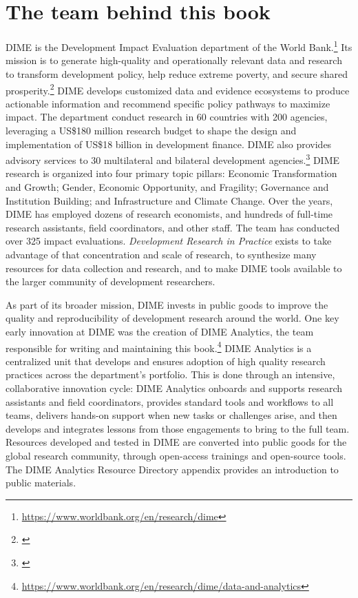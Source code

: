 \section{The team behind this book}
DIME is the Development Impact Evaluation department of the World Bank.\footnote{
  \url{https://www.worldbank.org/en/research/dime}}
Its mission is to generate high-quality and operationally relevant data and research
to transform development policy, help reduce extreme poverty, and secure shared prosperity.\footnote{\cite{legovini2015impact}}
DIME develops customized data and evidence ecosystems to produce actionable information
and recommend specific policy pathways to maximize impact.
The department conduct research in 60 countries with 200 agencies, leveraging a
US\$180 million research budget to shape the design and implementation of
US\$18 billion in development finance.
DIME also provides advisory services to 30 multilateral and bilateral development agencies.\footnote{\cite{legovini2019}}
DIME research is organized into four primary topic pillars:
Economic Transformation and Growth;
Gender, Economic Opportunity, and Fragility;
Governance and Institution Building;
and Infrastructure and Climate Change.
Over the years, DIME has employed dozens of research economists,
and hundreds of full-time research assistants, field coordinators, and other staff.
The team has conducted over 325 impact evaluations.
\textit{Development Research in Practice} exists to take advantage of that concentration and scale of research,
to synthesize many resources for data collection and research,
and to make DIME tools available to the larger community of development researchers.

As part of its broader mission, DIME invests in public goods
to improve the quality and reproducibility of development research around the world.
One key early innovation at DIME was the creation of DIME Analytics,
the team responsible for writing and maintaining this book.\footnote{
  \url{https://www.worldbank.org/en/research/dime/data-and-analytics}}
DIME Analytics is a centralized unit that develops and ensures adoption
of high quality research practices across the department's portfolio.
This is done through an intensive, collaborative innovation cycle:
DIME Analytics onboards and supports research assistants and field coordinators,
provides standard tools and workflows to all teams,
delivers hands-on support when new tasks or challenges arise,
and then develops and integrates lessons from those engagements to bring to the full team.
Resources developed and tested in DIME are converted into public goods
for the global research community, through open-access trainings and open-source tools.
The DIME Analytics Resource Directory appendix provides an introduction to public materials.

